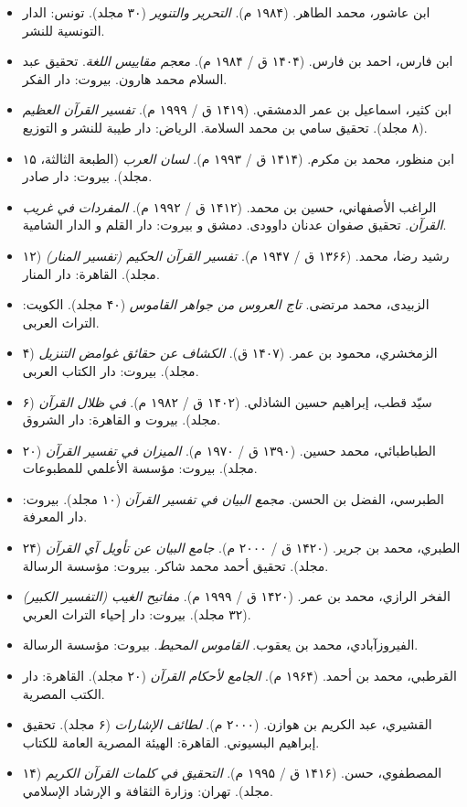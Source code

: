\documentclass[12pt,a4paper]{article}
\providecommand{\tightlist}{\setlength{\itemsep}{0pt}\setlength{\parskip}{0pt}}
\begin{document}
\begin{RTL}
\begin{otherlanguage}{persian}
\begin{itemize}
\tightlist
\item
  ابن عاشور، محمد الطاهر. (۱۹۸۴ م). \emph{التحرير والتنوير} (۳۰ مجلد).
  تونس: الدار التونسية للنشر.
\item
  ابن فارس، احمد بن فارس. (۱۴۰۴ ق / ۱۹۸۴ م). \emph{معجم مقاييس اللغة}.
  تحقیق عبد السلام محمد هارون. بیروت: دار الفکر.
\item
  ابن کثیر، اسماعیل بن عمر الدمشقي. (۱۴۱۹ ق / ۱۹۹۹ م). \emph{تفسير
  القرآن العظيم} (۸ مجلد). تحقیق سامي بن محمد السلامة. الریاض: دار طیبة
  للنشر و التوزیع.
\item
  ابن منظور، محمد بن مکرم. (۱۴۱۴ ق / ۱۹۹۳ م). \emph{لسان العرب} (الطبعة
  الثالثة، ۱۵ مجلد). بیروت: دار صادر.
\item
  الراغب الأصفهاني، حسین بن محمد. (۱۴۱۲ ق / ۱۹۹۲ م). \emph{المفردات في
  غريب القرآن}. تحقیق صفوان عدنان داوودی. دمشق و بیروت: دار القلم و
  الدار الشامية.
\item
  رشید رضا، محمد. (۱۳۶۶ ق / ۱۹۴۷ م). \emph{تفسير القرآن الحكيم (تفسير
  المنار)} (۱۲ مجلد). القاهرة: دار المنار.
\item
  الزبیدی، محمد مرتضی. \emph{تاج العروس من جواهر القاموس} (۴۰ مجلد).
  الکویت: التراث العربی.
\item
  الزمخشري، محمود بن عمر. (۱۴۰۷ ق). \emph{الكشاف عن حقائق غوامض التنزيل}
  (۴ مجلد). بیروت: دار الکتاب العربی.
\item
  سیّد قطب، إبراهیم حسین الشاذلي. (۱۴۰۲ ق / ۱۹۸۲ م). \emph{في ظلال
  القرآن} (۶ مجلد). بیروت و القاهرة: دار الشروق.
\item
  الطباطبائي، محمد حسین. (۱۳۹۰ ق / ۱۹۷۰ م). \emph{الميزان في تفسير
  القرآن} (۲۰ مجلد). بیروت: مؤسسة الأعلمي للمطبوعات.
\item
  الطبرسي، الفضل بن الحسن. \emph{مجمع البيان في تفسير القرآن} (۱۰ مجلد).
  بیروت: دار المعرفة.
\item
  الطبري، محمد بن جریر. (۱۴۲۰ ق / ۲۰۰۰ م). \emph{جامع البيان عن تأويل آي
  القرآن} (۲۴ مجلد). تحقیق أحمد محمد شاکر. بیروت: مؤسسة الرسالة.
\item
  الفخر الرازي، محمد بن عمر. (۱۴۲۰ ق / ۱۹۹۹ م). \emph{مفاتيح الغيب
  (التفسير الكبير)} (۳۲ مجلد). بیروت: دار إحياء التراث العربي.
\item
  الفیروزآبادي، محمد بن یعقوب. \emph{القاموس المحيط}. بیروت: مؤسسة
  الرسالة.
\item
  القرطبي، محمد بن أحمد. (۱۹۶۴ م). \emph{الجامع لأحكام القرآن} (۲۰
  مجلد). القاهرة: دار الکتب المصرية.
\item
  القشیري، عبد الکریم بن هوازن. (۲۰۰۰ م). \emph{لطائف الإشارات} (۶
  مجلد). تحقیق إبراهیم البسيوني. القاهرة: الهيئة المصرية العامة للکتاب.
\item
  المصطفوي، حسن. (۱۴۱۶ ق / ۱۹۹۵ م). \emph{التحقيق في كلمات القرآن
  الكريم} (۱۴ مجلد). تهران: وزارة الثقافة و الإرشاد الإسلامي.
\end{itemize}


\end{otherlanguage}
\end{RTL}
\end{document}
